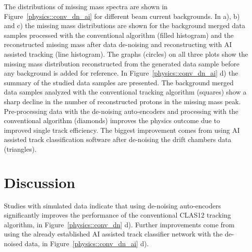 The distributions of missing mass spectra are shown in Figure~\ref{physics::conv_dn_ai} for different beam current backgrounds.
In a), b) and c) the missing mass distributions are shown for the background merged data samples processed with the conventional algorithm 
(filled histogram) and the reconstructed missing mass after data de-noising and reconstructing with AI assisted tracking (line histogram).
The graphs (circles) on all three plots show the missing mass distribution reconstructed from the generated data sample 
before any background is added for reference. In Figure~\ref{physics::conv_dn_ai} d) the summary of the studied data samples 
are presented. The background merged data samples analyzed with the conventional tracking algorithm (squares) show a sharp decline in
the number of reconstructed protons in the missing mass peak. Pre-processing data with the de-noising auto-encoders and processing
with the conventional algorithm (diamonds) improves the physics outcome due to improved single track efficiency. The biggest improvement
comes from using AI assisted track classification software after de-noising the drift chambers data (triangles). 


\section{Discussion}

Studies with simulated data indicate that using de-noising auto-encoders significantly improves the performance
of the conventional CLAS12 tracking algorithm, in Figure~\ref{physics::conv_dn} d). Further improvements come from using
the already established AI assisted track classifier network with the de-noised data, in Figure~\ref{physics::conv_dn_ai} d).


